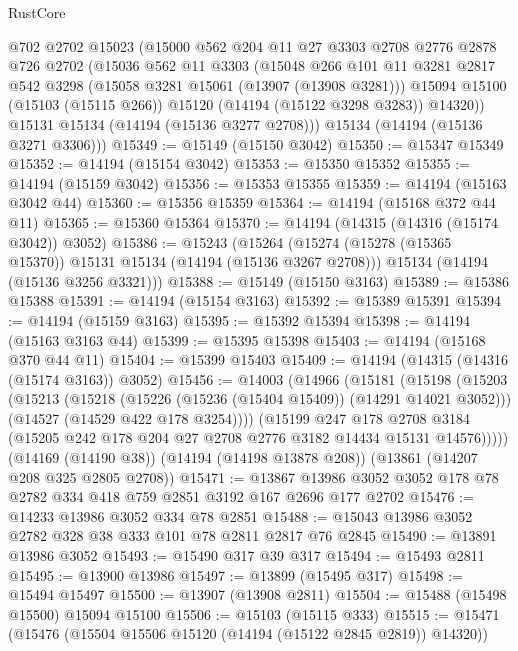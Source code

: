 \begin{lexlean}{RustCore}
\begin{coremodule}
      @702
      @2702
      @15023
      (@15000
        @562
        @204
        @11
        @27
        @3303
        @2708
        @2776
        @2878
        @726
        @2702
        (@15036
          @562
          @11
          @3303
          (@15048
            @266
            @101
            @11
            @3281
            @2817
            @542
            @3298
            (@15058 @3281 @15061 (@13907 (@13908 @3281)))
            @15094
            @15100
            (@15103 (@15115 @266))
            @15120
            (@14194 (@15122 @3298 @3283))
            @14320))
        @15131
        @15134
        (@14194 (@15136 @3277 @2708)))
      @15134
      (@14194 (@15136 @3271 @3306)))
@15349 := @15149 (@15150 @3042)
@15350 := @15347 @15349
@15352 := @14194 (@15154 @3042)
@15353 := @15350 @15352
@15355 := @14194 (@15159 @3042)
@15356 := @15353 @15355
@15359 := @14194 (@15163 @3042 @44)
@15360 := @15356 @15359
@15364 := @14194 (@15168 @372 @44 @11)
@15365 := @15360 @15364
@15370 := @14194 (@14315 (@14316 (@15174 @3042)) @3052)
@15386 := @15243
    (@15264
      (@15274 (@15278 (@15365 @15370)) @15131 @15134 (@14194 (@15136 @3267 @2708)))
      @15134
      (@14194 (@15136 @3256 @3321)))
@15388 := @15149 (@15150 @3163)
@15389 := @15386 @15388
@15391 := @14194 (@15154 @3163)
@15392 := @15389 @15391
@15394 := @14194 (@15159 @3163)
@15395 := @15392 @15394
@15398 := @14194 (@15163 @3163 @44)
@15399 := @15395 @15398
@15403 := @14194 (@15168 @370 @44 @11)
@15404 := @15399 @15403
@15409 := @14194 (@14315 (@14316 (@15174 @3163)) @3052)
@15456 := @14003
    (@14966
      (@15181
        (@15198
          (@15203
            (@15213
              (@15218 (@15226 (@15236 (@15404 @15409)) (@14291 @14021 @3052)))
              (@14527 (@14529 @422 @178 @3254))))
          (@15199
            @247
            @178
            @2708
            @3184
            (@15205 @242 @178 @204 @27 @2708 @2776 @3182 @14434 @15131 @14576)))))
    (@14169 (@14190 @38))
    (@14194 (@14198 @13878 @208))
    (@13861 (@14207 @208 @325 @2805 @2708))
@15471 := @13867 @13986 @3052 @3052 @178 @78 @2782 @334 @418 @759 @2851 @3192 @167 @2696 @177 @2702
@15476 := @14233 @13986 @3052 @334 @78 @2851
@15488 := @15043 @13986 @3052 @2782 @328 @38 @333 @101 @78 @2811 @2817 @76 @2845
@15490 := @13891 @13986 @3052
@15493 := @15490 @317 @39 @317
@15494 := @15493 @2811
@15495 := @13900 @13986
@15497 := @13899 (@15495 @317)
@15498 := @15494 @15497
@15500 := @13907 (@13908 @2811)
@15504 := @15488 (@15498 @15500) @15094 @15100
@15506 := @15103 (@15115 @333)
@15515 := @15471 (@15476 (@15504 @15506 @15120 (@14194 (@15122 @2845 @2819)) @14320))

\end{coremodule}
\end{lexlean}
